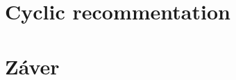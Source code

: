\documentclass[10pt,twoside,slovak,a4paper]{article}
\begin{document}
\section{Cyclic recommentation} \label{cyclic}



\section{Záver} \label{zaver} %




\newpage
\listoftodos[Notes]

\end{document}
